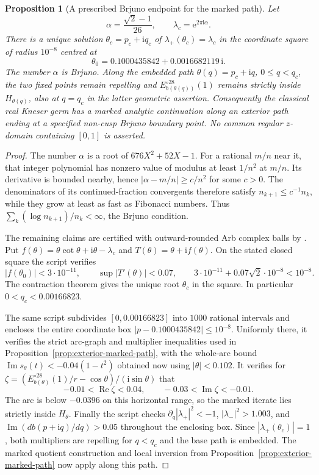 \documentclass[11pt]{amsart}
\newtheorem{proposition}[theorem]{Proposition}
\theoremstyle{definition}
\newcommand{\eee}{\mathrm{e}}
\newcommand{\ii}{\mathrm{i}}
\begin{document}
\begin{proposition}[A prescribed Brjuno endpoint for the marked path]
\label{prop:exterior-brjuno-path}
Let
\[
 \alpha=\frac{\sqrt2-1}{26},\qquad
 \lambda_c=\eee^{2\pi\ii\alpha}.
\]
There is a unique solution $\theta_c=p_c+\ii q_c$ of
$\lambda_+(\theta_c)=\lambda_c$ in the coordinate square of radius
$10^{-8}$ centred at
\[
 \theta_0=0.1000435842+0.0016682119\,\ii.
\]
The number $\alpha$ is Brjuno.  Along the embedded path
$\theta(q)=p_c+\ii q$, $0\le q<q_c$, the two fixed points remain
repelling and $E_{b(\theta(q))}^{\circ28}(1)$ remains strictly inside
$H_{\theta(q)}$, also at $q=q_c$ in the latter geometric assertion.
Consequently the classical real Kneser germ has a marked analytic
continuation along an exterior path ending at a specified non-cusp
Brjuno boundary point.  No common regular $z$-domain containing
$[0,1]$ is asserted.
\end{proposition}

\begin{proof}
The number $\alpha$ is a root of $676X^2+52X-1$.  For a rational
$m/n$ near it, that integer polynomial has nonzero value of modulus
at least $1/n^2$ at $m/n$.  Its derivative is bounded nearby, hence
$|\alpha-m/n|\ge c/n^2$ for some $c>0$.  The denominators of its
continued-fraction convergents therefore satisfy
$n_{k+1}\le c^{-1}n_k$, while they grow at least as fast as Fibonacci
numbers.  Thus $\sum_k(\log n_{k+1})/n_k<\infty$, the Brjuno condition.

The remaining claims are certified with outward-rounded Arb complex
balls by .  Put
$f(\theta)=\theta\cot\theta+\ii\theta-\lambda_c$ and
$T(\theta)=\theta+\ii f(\theta)$.  On the stated closed square the
script verifies
\[
 |f(\theta_0)|<3\cdot10^{-11},\qquad
 \sup|T'(\theta)|<0.07,\qquad
 3\cdot10^{-11}+0.07\sqrt2\cdot10^{-8}<10^{-8}.
\]
The contraction theorem gives the unique root $\theta_c$ in the
square.  In particular $0<q_c<0.00166823$.

The same script subdivides $[0,0.00166823]$ into $1000$ rational
intervals and encloses the entire coordinate box
$|p-0.1000435842|\le10^{-8}$.  Uniformly there, it verifies the
strict arc-graph and multiplier inequalities used in
Proposition~\ref{prop:exterior-marked-path}, with the whole-arc bound
$\operatorname{Im}s_\theta(t)<-0.04(1-t^2)$ obtained now using
$|\theta|<0.102$.  It verifies for
$\zeta=(E_{b(\theta)}^{\circ28}(1)/r-\cos\theta)/(\ii\sin\theta)$
that
\[
 -0.01<\operatorname{Re}\zeta<0.04,\qquad
 -0.03<\operatorname{Im}\zeta<-0.01.
\]
The arc is below $-0.0396$ on this horizontal range, so the marked
iterate lies strictly inside $H_\theta$.  Finally the script checks
$\partial_q|\lambda_+|^2<-1$, $|\lambda_-|^2>1.003$, and
$\operatorname{Im}(d b(p+\ii q)/dq)>0.05$ throughout the enclosing
box.  Since $|\lambda_+(\theta_c)|=1$, both multipliers are
repelling for $q<q_c$ and the base path is embedded.  The marked
quotient construction and local inversion from
Proposition~\ref{prop:exterior-marked-path} now apply along this path.
\end{proof}
\end{document}

